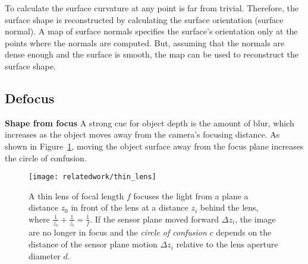 To calculate the surface curvature at any point is far from trivial. Therefore, the surface shape is reconstructed by calculating the surface orientation (surface normal). A map of surface normals specifies the surface's orientation only at the points where the normals are computed. But, assuming that the normals are dense enough and the surface is smooth, the map can be used to reconstruct the surface shape.

\subsection{Defocus}
\textbf{Shape from focus}
A strong cue for object depth is the amount of blur, which increases as the object moves away from the camera's focusing distance. As shown in Figure~\ref{fig:thin_lens}, moving the object surface away from the focus plane increases the circle of confusion.

\begin{figure}[h]
\centering
\texttt{[image: relatedwork/thin\_lens]}
\caption{A thin lens of focal length $f$ focuses the light from a plane a distance $z_0$ in front of the lens at a distance $z_i$ behind the lens, where $\frac{1}{z_o}+\frac{1}{z_i}=\frac{1}{f}$. If the sensor plane moved forward $\Delta z_i$, the image are no longer in focus and the \textit{circle of confusion} $c$ depends on the distance of the sensor plane motion $\Delta z_i$ relative to the lens aperture diameter $d$.}
\label{fig:thin_lens}
\end{figure}

